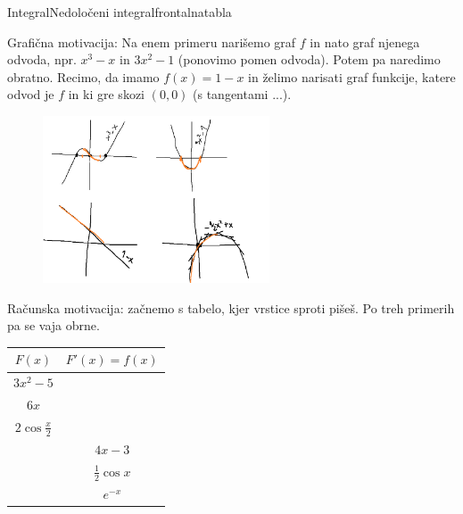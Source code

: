 \begin{priprava}{}{}{Integral}{Nedoločeni integral}{frontalna}{tabla}

Grafična motivacija: Na enem primeru narišemo graf $ f $ in nato graf njenega odvoda, npr. $ x^3 - x $ in $ 3x^2 - 1 $ (ponovimo pomen odvoda). Potem pa naredimo obratno. Recimo, da imamo $ f(x) = 1 - x $ in želimo narisati graf funkcije, katere odvod je $ f $ in ki gre skozi $ (0, 0) $ (s tangentami ...).

\begin{figure}[h]
    \centering
    \includegraphics[width=0.6\textwidth]{slike/graf_odvod_integral.png}
\end{figure}

Računska motivacija: začnemo s tabelo, kjer vrstice sproti pišeš. Po treh primerih pa se vaja obrne.  

\begin{center}
\begin{tabular}{ |c|c| } 
     $ F(x) $ & $ F'(x) = f(x) $ \\
     \hline \hline $ 3x^2 - 5 $ & \\
     \hline $ 6x $ & \\
     \hline $ 2 \cos{\frac{x}{2}} $ & \\
     \hline & $ 4x - 3 $ \\
     \hline & $ \frac{1}{2} \cos x $ \\
     \hline & $ e^{-x} $ \\
     \hline
\end{tabular}
\end{center}



\end{priprava}
